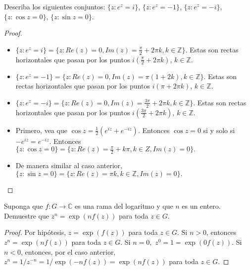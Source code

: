 \documentclass[12pt]{article}
\newcommand{\Z}{\mathbb{Z}}
\newcommand{\C}{\mathbb{C}}
\newenvironment{problem}[2][Problema]{\begin{trivlist}
\item[\hskip \labelsep {\bfseries #1}\hskip \labelsep {\bfseries #2.}]}{\end{trivlist}}
\begin{document}
\begin{problem}{6 pp. 44}
Describa los siguientes conjuntos: $\{z: e^z = i\}$, $\{z: e^z = -1\}$, $\{z: e^z = -i\}$, $\{z: \cos z = 0\}$, $\{z: \sin z = 0\}.$
\end{problem}
\begin{proof} \text{ }
\begin{itemize}
    \item  $\{z: e^z = i\} = \{z: Re(z) = 0, Im(z) = \frac{\pi}{2} + 2\pi k, k \in \Z \}.$ Estas son rectas horizontales que pasan por los puntos $i(\frac{\pi}{2} + 2\pi k)$, $k \in \Z$.
    
    \item $\{z: e^z = -1\} = \{z: Re(z) = 0, Im(z) = \pi(1 + 2 k), k \in \Z \}.$ Estas son rectas horizontales que pasan por los puntos $i(\pi + 2\pi k)$, $k \in \Z$.
    
    \item $\{z: e^z = -i\} = \{z: Re(z) = 0, Im(z) = \frac{3\pi}{2} + 2\pi k, k \in \Z \}$. Estas son rectas horizontales que pasan por los puntos $i(\frac{3\pi}{2}+ 2\pi k)$, $k \in \Z$.
    
    \item Primero, vea que $\cos z = \frac{1}{2}(e^{iz} + e^{-iz}).$ Entonces $\cos z = 0$ si y solo si $-e^{iz} = e^{-iz}$. Entonces $\{z: \cos z = 0\} = \{z: Re(z) = \frac{\pi}{2} + k \pi, k \in Z, Im(z) = 0 \}.$
    
    \item De manera similar al caso anterior, $\{z: \sin z = 0\} = \{z: Re(z) = \pi k, k \in \Z, Im(z) = 0 \}.$
\end{itemize}
\end{proof}

\begin{problem}{11 pp. 44}
Suponga que $f: G \to \C$ es una rama del logaritmo y que $n$ es un entero. Demuestre que $z^n = \exp(n f(z))$ para toda $z \in G.$
\end{problem}
\begin{proof}
Por hipótesis, $z = \exp(f(z))$ para toda $z \in G.$ Si $n > 0$, entonces $z^n = \exp(n f(z))$ para toda $z \in G.$ Si $n = 0,$ $z^0 = 1 = \exp(0 f(z)).$ Si $n < 0$, entonces, por el caso anterior, $z^n = 1/z^{-n} = 1 / \exp(-n f(z)) = \exp(n f(z))$ para toda $z \in G.$
\end{proof}
\end{document}
